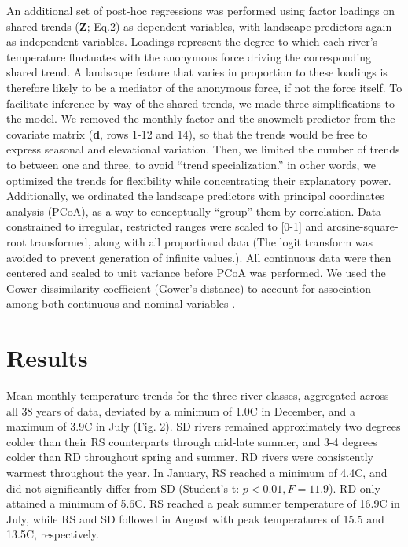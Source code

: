 \documentclass[notitlepage]{article}
\begin{document}
An additional set of post-hoc regressions was performed using factor loadings on shared trends (\textbf{Z}; Eq.2) as dependent variables, with landscape predictors again as independent variables. Loadings represent the degree to which each river's temperature fluctuates with the anonymous force driving the corresponding shared trend. A landscape feature that varies in proportion to these loadings is therefore likely to be a mediator of the anonymous force, if not the force itself. To facilitate inference by way of the shared trends, we made three simplifications to the model. We removed the monthly factor and the snowmelt predictor from the covariate matrix (\textbf{d}, rows 1-12 and 14), so that the trends would be free to express seasonal and elevational variation. Then, we limited the number of trends to between one and three, to avoid ``trend specialization.'' in other words, we optimized the trends for flexibility while concentrating their explanatory power. Additionally, we ordinated the landscape predictors with principal coordinates analysis (PCoA), as a way to conceptually ``group'' them by correlation. Data constrained to irregular, restricted ranges were scaled to [0-1] and arcsine-square-root transformed, along with all proportional data (The logit transform was avoided to prevent generation of infinite values.). All continuous data were then centered and scaled to unit variance before PCoA was performed. We used the Gower dissimilarity coefficient (Gower's distance) to account for association among both continuous and nominal variables \citep{gowerDist}.

\section*{Results}

Mean monthly temperature trends for the three river classes, aggregated across all 38 years of data, deviated by a minimum of 1.0\degree C in December, and a maximum of 3.9\degree C in July (Fig. 2). SD rivers remained approximately two degrees colder than their RS counterparts through mid-late summer, and 3-4 degrees colder than RD throughout spring and summer. RD rivers were consistently warmest throughout the year. In January, RS reached a minimum of 4.4\degree C, and did not significantly differ from SD (Student's t: $p<0.01, F=11.9$). RD only attained a minimum of 5.6\degree C. RS reached a peak summer temperature of 16.9\degree C in July, while RS and SD followed in August with peak temperatures of 15.5 and 13.5\degree C, respectively.
\end{document}
